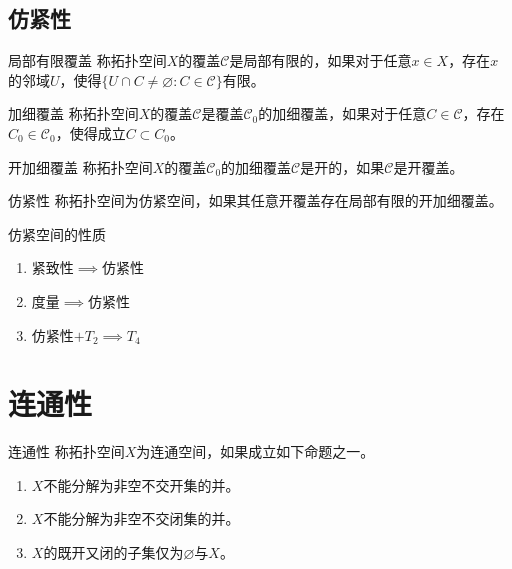 \documentclass[lang = cn, scheme = chinese, thmcnt = section, usesamecnt]{elegantbook}
\newcommand{\sub}{\subset}             %
\begin{document}
\subsection{仿紧性}

\begin{definition}{局部有限覆盖}
	称拓扑空间$X$的覆盖$\mathscr{C}$是局部有限的，如果对于任意$x\in X$，存在$x$的邻域$U$，使得$\{ U\cap C\ne\varnothing:C\in\mathscr{C} \}$有限。
\end{definition}

\begin{definition}{加细覆盖}
	称拓扑空间$X$的覆盖$\mathscr{C}$是覆盖$\mathscr{C}_0$的加细覆盖，如果对于任意$C\in\mathscr{C}$，存在$C_0\in\mathscr{C}_0$，使得成立$C\sub C_0$。
\end{definition}

\begin{definition}{开加细覆盖}
	称拓扑空间$X$的覆盖$\mathscr{C}_0$的加细覆盖$\mathscr{C}$是开的，如果$\mathscr{C}$是开覆盖。
\end{definition}

\begin{definition}{仿紧性}
	称拓扑空间为仿紧空间，如果其任意开覆盖存在局部有限的开加细覆盖。
\end{definition}

\begin{theorem}{仿紧空间的性质}
	\begin{enumerate}
		\item 紧致性$\implies$仿紧性
		\item 度量$\implies$仿紧性
		\item 仿紧性$+T_2\implies T_4$
	\end{enumerate}
\end{theorem}

\section{连通性}

\begin{definition}{连通性}
	称拓扑空间$X$为连通空间，如果成立如下命题之一。
	\begin{enumerate}
		\item $X$不能分解为非空不交开集的并。
		\item $X$不能分解为非空不交闭集的并。
		\item $X$的既开又闭的子集仅为$\varnothing$与$X$。
	\end{enumerate}
\end{definition}
\end{document}
